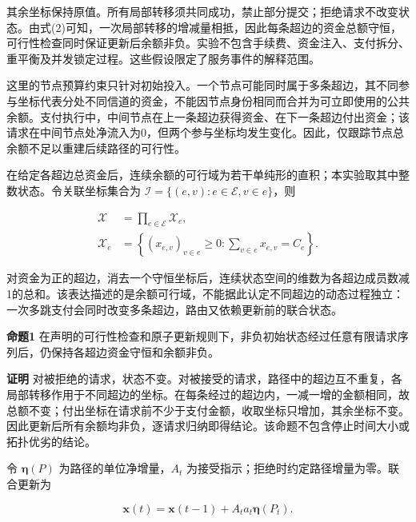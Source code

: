 \documentclass[UTF8,a4paper,twocolumn,fontset=none,zihao=5]{ctexart}
\begin{document}
其余坐标保持原值。所有局部转移须共同成功，禁止部分提交；拒绝请求不改变状态。由式(2)可知，一次局部转移的增减量相抵，因此每条超边的资金总额守恒，可行性检查同时保证更新后余额非负。实验不包含手续费、资金注入、支付拆分、重平衡及并发锁定过程。这些假设限定了服务事件的解释范围。


这里的节点预算约束只针对初始投入。一个节点可能同时属于多条超边，其不同参与坐标代表分处不同信道的资金，不能因节点身份相同而合并为可立即使用的公共余额。支付执行中，中间节点在上一条超边获得资金、在下一条超边付出资金；该请求在中间节点处净流入为0，但两个参与坐标均发生变化。因此，仅跟踪节点总余额不足以重建后续路径的可行性。


在给定各超边总资金后，连续余额的可行域为若干单纯形的直积；本实验取其中整数状态。令关联坐标集合为 $\mathcal I=\{(e,v):e\in\mathcal E,v\in e\}$，则



\begin{equation}
\begin{aligned}\mathcal X&=\prod_{e\in\mathcal E}\mathcal X_e,\\\mathcal X_e&=\left\{(x_{e,v})_{v\in e}\geq0:\sum_{v\in e}x_{e,v}=C_e\right\}.\end{aligned}
\label{eq:3}\end{equation}


对资金为正的超边，消去一个守恒坐标后，连续状态空间的维数为各超边成员数减1的总和。该表达描述的是余额可行域，不能据此认定不同超边的动态过程独立：一次多跳支付会同时改变多条超边，路由又依赖更新前的联合状态。


\noindent\textbf{命题1} 在声明的可行性检查和原子更新规则下，非负初始状态经过任意有限请求序列后，仍保持各超边资金守恒和余额非负。\par

\noindent\textbf{证明} 对被拒绝的请求，状态不变。对被接受的请求，路径中的超边互不重复，各局部转移作用于不同超边的坐标。在每条经过的超边内，一减一增的金额相同，故总额不变；付出坐标在请求前不少于支付金额，收取坐标只增加，其余坐标不变。因此更新后所有余额均非负，逐请求归纳即得结论。该命题不包含停止时间大小或拓扑优劣的结论。\par

令 $\boldsymbol\eta(P)$ 为路径的单位净增量，$A_t$ 为接受指示；拒绝时约定路径增量为零。联合更新为



\begin{equation}
\boldsymbol x(t)=\boldsymbol x(t-1)+A_ta_t\boldsymbol\eta(P_t).
\label{eq:4}\end{equation}
\end{document}
